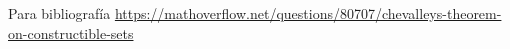 \documentclass[twoside]{article}
\begin{document}
\begin{solucion}
Para bibliografía \url{https://mathoverflow.net/questions/80707/chevalleys-theorem-on-constructible-sets} 


\end{solucion}
\end{document}

